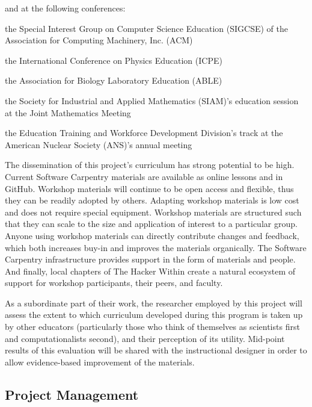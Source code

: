 \documentclass{proposalnsf}
\newlength{\up}
\begin{document}
and at the following conferences:

\begin{compactitem}

\item
  the Special Interest Group on Computer Science Education (SIGCSE) of
  the Association for Computing Machinery, Inc. (ACM)

\item
  the International Conference on Physics Education (ICPE)

\item
  the Association for Biology Laboratory Education (ABLE)

\item
  the Society for Industrial and Applied Mathematics (SIAM)'s
  education session at the Joint Mathematics Meeting

\item
  the Education Training and Workforce Development Division's track at
  the American Nuclear Society (ANS)'s annual meeting

\end{compactitem}

The dissemination of this project's curriculum has strong potential to
be high. Current Software Carpentry materials are available as online lessons and in GitHub. Workshop materials will continue to be open access and flexible, thus they can be readily adopted by others. Adapting workshop materials is
low cost and does not require special equipment. Workshop materials
are structured such that they can scale to the size and application of
interest to a particular group. Anyone using
workshop materials can directly contribute changes and feedback, which
both increases buy-in and improves the materials organically. The Software Carpentry infrastructure
provides support in the form of materials and people. And
finally, local chapters of The Hacker Within create a natural
ecosystem of support for workshop participants, their peers, and
faculty.

As a subordinate part of their work, the researcher employed by this
project will assess the extent to which curriculum developed during
this program is taken up by other educators (particularly those who
think of themselves as scientists first and computationalists second),
and their perception of its utility.  Mid-point results of this
evaluation will be shared with the instructional designer in order to
allow evidence-based improvement of the materials.

\subsection{Project Management}
\end{document}
